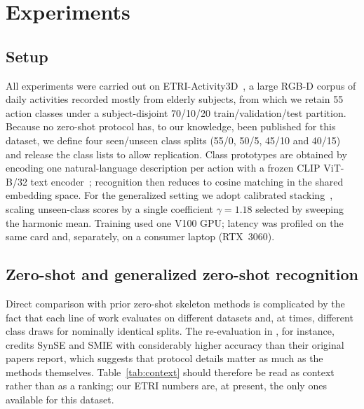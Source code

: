
\section{Experiments}

\subsection{Setup}
All experiments were carried out on ETRI-Activity3D~\cite{jang2020etri}, a
large RGB-D corpus of daily activities recorded mostly from elderly subjects,
from which we retain 55 action classes under a subject-disjoint 70/10/20
train/validation/test partition. Because no zero-shot protocol has, to our
knowledge, been published for this dataset, we define four seen/unseen class
splits (55/0, 50/5, 45/10 and 40/15) and release the class lists to allow
replication. Class prototypes are obtained by encoding one natural-language
description per action with a frozen CLIP ViT-B/32 text encoder~\cite{radford2021clip};
recognition then reduces to cosine matching in the shared embedding space.
For the generalized setting we adopt calibrated stacking~\cite{chao2016gzsl},
scaling unseen-class scores by a single coefficient $\gamma=1.18$ selected by
sweeping the harmonic mean. Training used one V100 GPU; latency was profiled
on the same card and, separately, on a consumer laptop (RTX~3060).

\subsection{Zero-shot and generalized zero-shot recognition}
Direct comparison with prior zero-shot skeleton methods is complicated by the
fact that each line of work evaluates on different datasets and, at times,
different class draws for nominally identical splits. The re-evaluation in
\cite{chen2024star}, for instance, credits SynSE and SMIE with considerably
higher accuracy than their original papers report, which suggests that
protocol details matter as much as the methods themselves. Table~\ref{tab:context}
should therefore be read as context rather than as a ranking; our ETRI numbers
are, at present, the only ones available for this dataset.

